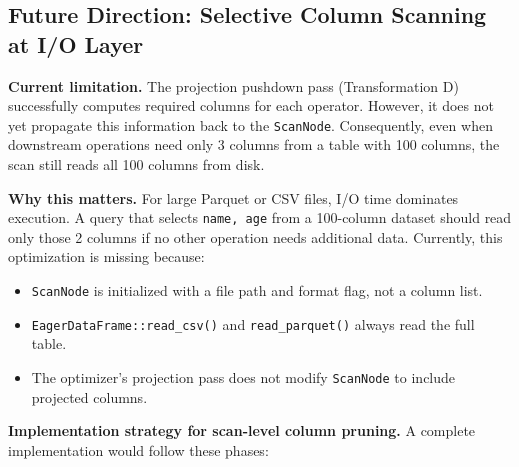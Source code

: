 \documentclass[11pt,a4paper]{article}
\begin{document}
\subsection{Future Direction: Selective Column Scanning at I/O Layer}

\textbf{Current limitation.}
The projection pushdown pass (Transformation D) successfully computes required columns for each operator. However, it does not yet propagate this information back to the \texttt{ScanNode}. Consequently, even when downstream operations need only 3 columns from a table with 100 columns, the scan still reads all 100 columns from disk.

\textbf{Why this matters.}
For large Parquet or CSV files, I/O time dominates execution. A query that selects \texttt{name, age} from a 100-column dataset should read only those 2 columns if no other operation needs additional data. Currently, this optimization is missing because:
\begin{itemize}[leftmargin=*]
	\item \texttt{ScanNode} is initialized with a file path and format flag, not a column list.
	\item \texttt{EagerDataFrame::read\_csv()} and \texttt{read\_parquet()} always read the full table.
	\item The optimizer's projection pass does not modify \texttt{ScanNode} to include projected columns.
\end{itemize}

\textbf{Implementation strategy for scan-level column pruning.}
A complete implementation would follow these phases:
\end{document}
